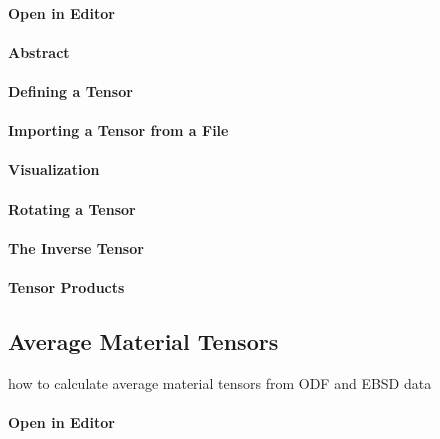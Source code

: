 \documentclass{article}
\begin{document}
                  
			\paragraph{Open in Editor}
		
			\paragraph{Abstract}
		
			\paragraph{Defining a Tensor}
		
			\paragraph{Importing a Tensor from a File}
		
			\paragraph{Visualization}
		
			\paragraph{Rotating a Tensor}
		
			\paragraph{The Inverse Tensor}
		
			\paragraph{Tensor Products}
		
		\subsection{Average Material Tensors}

		
                     \begin{par}
how to calculate average material tensors from ODF and EBSD data
\end{par} \vspace{1em}

                  
			\paragraph{Open in Editor}
		
\end{document}
